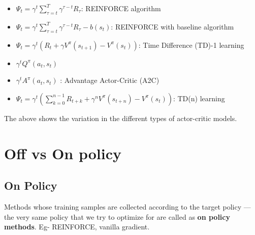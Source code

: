 \begin{itemize}
    \item $\Psi_t =\gamma^t \sum^T_{\tau=t} \gamma^{\tau-t} R_{\tau}$: REINFORCE algorithm
    \item $\Psi_t =\gamma^t \sum^T_{\tau=t} \gamma^{\tau-t} R_{\tau}-b(s_t)$: REINFORCE with baseline algorithm 
    \item $\Psi_t = \gamma^t(R_t + \gamma V^{\pi}(s_{t+1})-V^{\pi}(s_{t}))$: Time Difference (TD)-1 learning
    \item $\gamma^t Q^{\pi}(a_t,s_t)$
    \item $\gamma^t A^{\pi}(a_t,s_t)$ : Advantage Actor-Critic (A2C)
    \item $\Psi_t = \gamma^t(\sum^{n-1}_{k=0} R_{t+k} + \gamma^n V^{\pi}(s_{t+n})-V^{\pi}(s_{t}))$: TD(n) learning
\end{itemize} 
The above shows the variation in the different types of actor-critic models.
\section{Off vs On policy}
\subsection{On Policy}
Methods whose training samples are collected according to the target policy — the very same policy that we try to optimize for are called as \textbf{on policy methods}\cite{lilianwengPolicyGradient}. Eg- REINFORCE, vanilla gradient.
